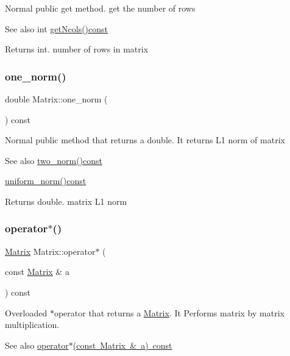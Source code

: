 Normal public get method. get the number of rows \begin{DoxySeeAlso}{See also}
int \mbox{\hyperlink{class_matrix_ae0a5f2154953b8d129a90b04f91d9079}{get\+Ncols()const}} 
\end{DoxySeeAlso}
\begin{DoxyReturn}{Returns}
int. number of rows in matrix 
\end{DoxyReturn}
\mbox{\label{class_matrix_af4d468252f3ecbbcaa5726c76e332b4c}} 
\subsubsection{\texorpdfstring{one\+\_\+norm()}{one\_norm()}}
{\footnotesize\ttfamily double Matrix\+::one\+\_\+norm (\begin{DoxyParamCaption}{ }\end{DoxyParamCaption}) const}

Normal public method that returns a double. It returns L1 norm of matrix \begin{DoxySeeAlso}{See also}
\mbox{\hyperlink{class_matrix_aac496af05ec7aa26afc2b9c6d0ab8b66}{two\+\_\+norm()const}} 

\mbox{\hyperlink{class_matrix_a43066c7fe6418aad40170b85415063e8}{uniform\+\_\+norm()const}} 
\end{DoxySeeAlso}
\begin{DoxyReturn}{Returns}
double. matrix L1 norm 
\end{DoxyReturn}
\mbox{\label{class_matrix_aaa40c78e6b3bb5bbf572d35612dbf6a7}} 
\subsubsection{\texorpdfstring{operator$\ast$()}{operator*()}}
{\footnotesize\ttfamily \mbox{\hyperlink{class_matrix}{Matrix}} Matrix\+::operator$\ast$ (\begin{DoxyParamCaption}\item[{const \mbox{\hyperlink{class_matrix}{Matrix}} \&}]{a }\end{DoxyParamCaption}) const}

Overloaded $\ast$operator that returns a \mbox{\hyperlink{class_matrix}{Matrix}}. It Performs matrix by matrix multiplication. \begin{DoxySeeAlso}{See also}
\mbox{\hyperlink{class_matrix_aaa40c78e6b3bb5bbf572d35612dbf6a7}{operator$\ast$(const Matrix \& a) const}} 
\end{DoxySeeAlso}

